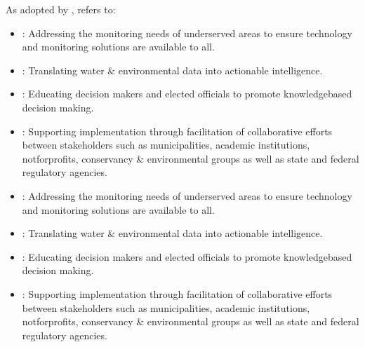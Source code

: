 \documentclass[letterpaper,12pt,english]{book}
\begin{document}
\sphinxAtStartPar
As adopted by {\hyperref[\detokenize{glossary:term-REON}]{}}, {\hyperref[\detokenize{glossary:term-DIKW}]{}} refers to:
\begin{itemize}
\item {} 
\sphinxAtStartPar
{}: Addressing the monitoring needs of under\sphinxhyphen{}served areas to ensure technology and monitoring solutions are available to all.

\item {} 
\sphinxAtStartPar
{}: Translating water \& environmental data into actionable intelligence.

\item {} 
\sphinxAtStartPar
{}: Educating decision makers and elected officials to promote knowledge\sphinxhyphen{}based decision making.

\item {} 
\sphinxAtStartPar
{}: Supporting implementation through facilitation of collaborative efforts between stakeholders such as municipalities, academic institutions, not\sphinxhyphen{}for\sphinxhyphen{}profits, conservancy \& environmental groups as well as state and federal regulatory agencies.

\end{itemize}
\begin{itemize}
\item {} 
\sphinxAtStartPar
{}: Addressing the monitoring needs of under\sphinxhyphen{}served areas to ensure technology and monitoring solutions are available to all.

\item {} 
\sphinxAtStartPar
{}: Translating water \& environmental data into actionable intelligence.

\item {} 
\sphinxAtStartPar
{}: Educating decision makers and elected officials to promote knowledge\sphinxhyphen{}based decision making.

\item {} 
\sphinxAtStartPar
{}: Supporting implementation through facilitation of collaborative efforts between stakeholders such as municipalities, academic institutions, not\sphinxhyphen{}for\sphinxhyphen{}profits, conservancy \& environmental groups as well as state and federal regulatory agencies.

\end{itemize}
\end{document}
